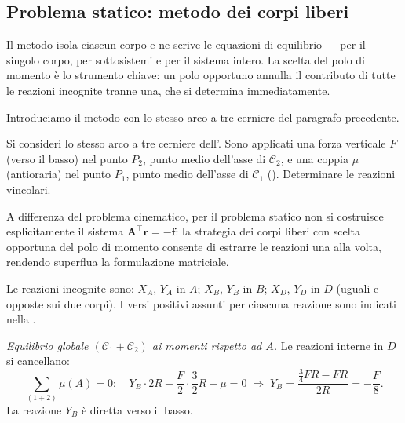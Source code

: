 \subsection{Problema statico: metodo dei corpi liberi}
\label{sec:corpi_liberi}


Il metodo isola ciascun corpo e ne scrive le
equazioni di equilibrio --- per il singolo corpo, per sottosistemi e per il
sistema intero. La scelta del polo di momento è lo strumento chiave: un polo
opportuno annulla il contributo di tutte le reazioni incognite tranne una,
che si determina immediatamente.

Introduciamo il metodo con lo stesso arco a tre cerniere del
paragrafo precedente.

\begin{esempio}
	\label{ex:arco_statico}
	Si consideri lo stesso arco a tre cerniere
	dell'. Sono applicati
	una forza verticale $F$ (verso il basso) nel punto $P_2$,
	punto medio dell'asse di $\mathcal{C}_2$, e una coppia
	$\mu$ (antioraria) nel punto $P_1$, punto medio dell'asse
	di $\mathcal{C}_1$ (). Determinare le reazioni vincolari.
	



	
	\begin{svolgimento}
		A differenza del problema cinematico, per il problema
		statico non si costruisce esplicitamente il sistema
		$\bm{A}^{\top}\bm{r} = -\bm{f}$: la strategia dei
		corpi liberi con scelta opportuna del polo di momento
		consente di estrarre le reazioni una alla volta,
		rendendo superflua la formulazione matriciale.
		
		Le reazioni incognite sono: $X_A$, $Y_A$ in $A$;
		$X_B$, $Y_B$ in $B$; $X_D$, $Y_D$ in $D$ (uguali e
		opposte sui due corpi). I versi positivi assunti per
		ciascuna reazione sono indicati nella
		.
		
		\smallskip
		\noindent\textit{Equilibrio globale $(\mathcal{C}_1 +
			\mathcal{C}_2)$ ai momenti rispetto ad $A$.}
		Le reazioni interne in $D$ si cancellano:
		\begin{equation*}
			\sum_{(1+2)}\mu(A)= 0:\quad
			Y_B \cdot 2R
			- \frac{F}{2} \cdot \frac{3}{2}R
			+ \mu = 0
			\;\Longrightarrow\;
			Y_B = \frac{\frac{3}{4}FR - FR}{2R}
			= -\frac{F}{8}.
		\end{equation*}
		La reazione $Y_B$ è diretta verso il basso.
		

\end{svolgimento}
\end{esempio}
